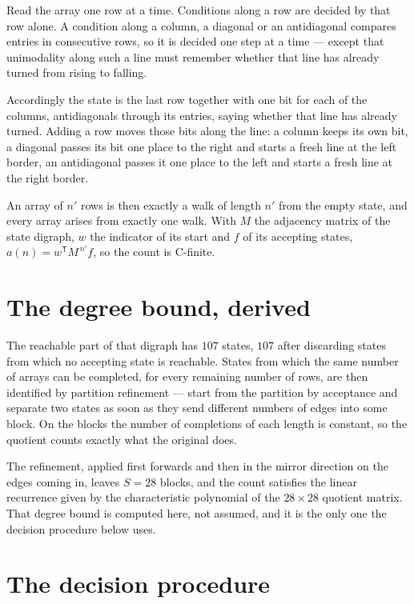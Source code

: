 \documentclass[11pt]{article}
\theoremstyle{definition}
\begin{document}
Read the array one row at a time. Conditions along a row are decided by that row alone. A condition along a column, a diagonal or an antidiagonal compares entries in consecutive rows, so it is decided one step at a time --- except that unimodality along such a line must remember whether that line has already turned from rising to falling.

Accordingly the state is the last row together with one bit for each of the columns, antidiagonals through its entries, saying whether that line has already turned. Adding a row moves those bits along the line: a column keeps its own bit, a diagonal passes its bit one place to the right and starts a fresh line at the left border, an antidiagonal passes it one place to the left and starts a fresh line at the right border.

An array of $n'$ rows is then exactly a walk of length $n'$ from the empty state, and every array arises from exactly one walk. With $M$ the adjacency matrix of the state digraph, $w$ the indicator of its start and $f$ of its accepting states, $a(n) = w^{\mathsf T}M^{\,n'}f$, so the count is C-finite.

\section{The degree bound, derived}

The reachable part of that digraph has $107$ states, $107$ after discarding states from which no accepting state is reachable. States from which the same number of arrays can be completed, for every remaining number of rows, are then identified by partition refinement --- start from the partition by acceptance and separate two states as soon as they send different numbers of edges into some block. On the blocks the number of completions of each length is constant, so the quotient counts exactly what the original does.

The refinement, applied first forwards and then in the mirror direction on the edges coming in, leaves $S = 28$ blocks, and the count satisfies the linear recurrence given by the characteristic polynomial of the $28 \times 28$ quotient matrix. That degree bound is computed here, not assumed, and it is the only one the decision procedure below uses.

\section{The decision procedure}
\end{document}
